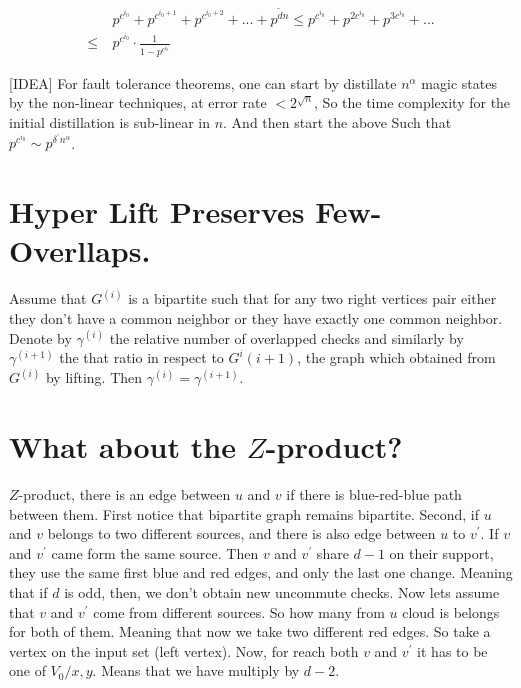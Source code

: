 \begin{equation*}
  \begin{split}
    & p^{c^{i_{0}}}+ p^{c^{i_{0}+1}}+ p^{c^{i_{0}+2}} + ... + p^{\tilde{d}
    n}\le  p^{c^{i_{0}}}+ p^{2c^{i_{0}}}+ p^{3c^{i_{0}}} + ... \\
    \le \  & p^{c^{i_{0}}} \cdot \frac{1}{1 - p^{c^{i_{0}}}}
  \end{split}
\end{equation*}

[IDEA] For fault tolerance theorems, one can start by distillate $n^{\alpha}$
magic states by the non-linear techniques, at error rate  $< 2^{\sqrt{n}}$, So
the time complexity for the initial distillation is sub-linear in $n$. And
then start the above Such that $p^{c^{i_{0}}} \sim
p^{\delta^{\prime}n^{\alpha}}$.

\section{Hyper Lift Preserves Few-Overllaps.}

Assume that  $G^{(i)}$ is a bipartite such that for any two right vertices pair
either they don't have a common neighbor or they have exactly one common
neighbor. Denote by $\gamma^{(i)}$ the relative number of overlapped checks
and similarly by $\gamma^{(i+1)}$ the that ratio in respect to $G^i{(i+1)}$,
the graph which obtained from $G^{(i)}$ by lifting. Then $\gamma^{(i)} =
\gamma^{(i+1)}$.

\section{ What about the $Z$-product? }
$Z$-product, there is an edge between $u$ and $v$ if there is blue-red-blue
path between them. First notice that bipartite graph remains bipartite.
Second, if $u$ and $v$ belongs to two different sources, and there is also
edge between $u$ to $v^{\prime}$. If $v$ and $v^{\prime}$ came form the same
source. Then $v$ and $v^{\prime}$ share $d-1$ on their support, they use the
same first blue and red edges, and only the last one change. Meaning that if
$d$ is odd, then, we don't obtain new uncommute checks. Now lets assume that
$v$ and $v^{\prime}$ come from different sources. So how many from $u$ cloud
is belongs for both of them. Meaning that now we take two different red edges.
So take a vertex on the input set (left vertex). Now, for reach both $v$ and
$v^{\prime}$ it has to be one of $V_{0}/{x,y}$. Means that we have multiply by
$d-2$.

